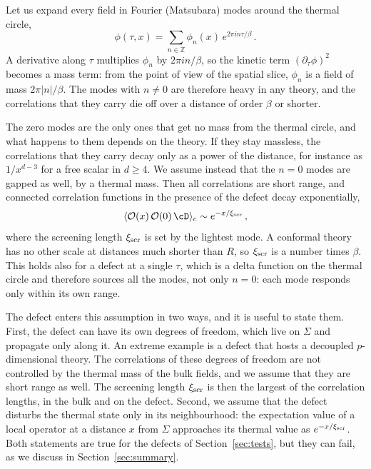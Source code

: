 \documentclass[a4paper,11pt]{article}
\newcommand{\xiscr}{\xi_{\rm scr}}
\begin{document}
Let us expand every field in Fourier (Matsubara) modes around the thermal circle,
\begin{equation}
	\phi(\tau,x)=\sum_{n\in\mathbb{Z}}\phi_n(x)\,e^{2\pi i n\tau/\beta} \, .
\end{equation}
A derivative along $\tau$ multiplies $\phi_n$ by $2\pi i n/\beta$, so the kinetic term $(\partial_\tau\phi)^2$ becomes a mass term: from the point of view of the spatial slice, $\phi_n$ is a field of mass $2\pi|n|/\beta$. The modes with $n\neq0$ are therefore heavy in any theory, and the correlations that they carry die off over a distance of order $\beta$ or shorter.

The zero modes are the only ones that get no mass from the thermal circle, and what happens to them depends on the theory. If they stay massless, the correlations that they carry decay only as a power of the distance, for instance as $1/x^{d-3}$ for a free scalar in $d\ge4$. We assume instead that the $n=0$ modes are gapped as well, by a thermal mass. Then all correlations are short range, and connected correlation functions in the presence of the defect decay exponentially,
\begin{equation}\label{eq:screen}
	\langle \mathcal{O}(x)\,\mathcal{O}(0)\,\cD\rangle_c\sim e^{-x/\xiscr}\, ,
\end{equation}
where the screening length $\xiscr$ is set by the lightest mode. A conformal theory has no other scale at distances much shorter than $R$, so $\xiscr$ is a number times $\beta$. This holds also for a defect at a single $\tau$, which is a delta function on the thermal circle and therefore sources all the modes, not only $n=0$: each mode responds only within its own range.

The defect enters this assumption in two ways, and it is useful to state them. First, the defect can have its own degrees of freedom, which live on $\Sigma$ and propagate only along it. An extreme example is a defect that hosts a decoupled $p$-dimensional theory. The correlations of these degrees of freedom are not controlled by the thermal mass of the bulk fields, and we assume that they are short range as well. The screening length $\xiscr$ is then the largest of the correlation lengths, in the bulk and on the defect. Second, we assume that the defect disturbs the thermal state only in its neighbourhood: the expectation value of a local operator at a distance $x$ from $\Sigma$ approaches its thermal value as $e^{-x/\xiscr}$. Both statements are true for the defects of Section~\ref{sec:tests}, but they can fail, as we discuss in Section~\ref{sec:summary}.
\end{document}
